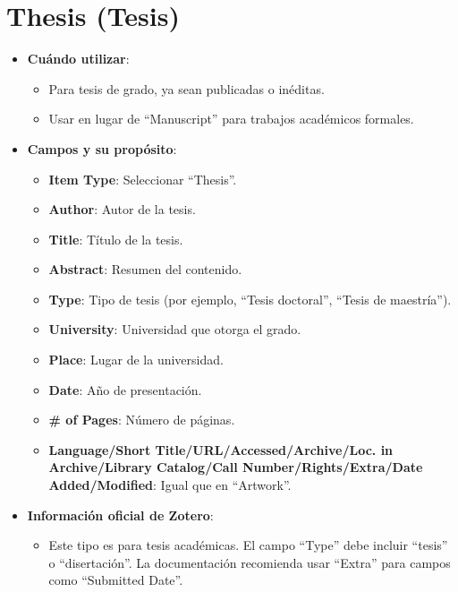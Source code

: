 \documentclass[
  jou,
  floatsintext,
  longtable,
  a4paper,
  nolmodern,
  notxfonts,
  notimes,
  12pt,
  colorlinks=true,linkcolor=blue,citecolor=blue,urlcolor=blue]{apa7}
\providecommand{\tightlist}{%
  \setlength{\itemsep}{0pt}\setlength{\parskip}{0pt}}
\begin{document}
\section{Thesis (Tesis)}\label{thesis-tesis}

\begin{itemize}
\tightlist
\item
  \textbf{Cuándo utilizar}:

  \begin{itemize}
  \tightlist
  \item
    Para tesis de grado, ya sean publicadas o inéditas.
  \item
    Usar en lugar de ``Manuscript'' para trabajos académicos formales.
  \end{itemize}
\item
  \textbf{Campos y su propósito}:

  \begin{itemize}
  \tightlist
  \item
    \textbf{Item Type}: Seleccionar ``Thesis''.
  \item
    \textbf{Author}: Autor de la tesis.
  \item
    \textbf{Title}: Título de la tesis.
  \item
    \textbf{Abstract}: Resumen del contenido.
  \item
    \textbf{Type}: Tipo de tesis (por ejemplo, ``Tesis doctoral'',
    ``Tesis de maestría'').
  \item
    \textbf{University}: Universidad que otorga el grado.
  \item
    \textbf{Place}: Lugar de la universidad.
  \item
    \textbf{Date}: Año de presentación.
  \item
    \textbf{\# of Pages}: Número de páginas.
  \item
    \textbf{Language/Short Title/URL/Accessed/Archive/Loc. in
    Archive/Library Catalog/Call Number/Rights/Extra/Date
    Added/Modified}: Igual que en ``Artwork''.
  \end{itemize}
\item
  \textbf{Información oficial de Zotero}:

  \begin{itemize}
  \tightlist
  \item
    Este tipo es para tesis académicas. El campo ``Type'' debe incluir
    ``tesis'' o ``disertación''. La documentación recomienda usar
    ``Extra'' para campos como ``Submitted Date''.
  \end{itemize}
\end{itemize}
\end{document}
